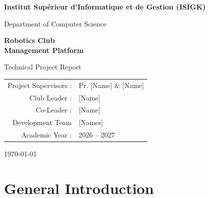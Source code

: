 \documentclass[12pt,a4paper]{report}
\begin{document}
\begin{titlepage}
    \centering
    \vspace*{1cm}

    {\Large \textbf{Institut Supérieur d'Informatique et de Gestion (ISIGK)}\par}
    \vspace{0.5cm}
    {\large Department of Computer Science\par}

    \vspace{2cm}
    {\Huge \textbf{Robotics Club\\[0.2cm] Management Platform}\par}
    \vspace{1cm}
    {\Large Technical Project Report\par}

    \vspace{2cm}
    {\large
    \begin{tabular}{rl}
        Project Supervisors : & Pr. [Name] \& [Name] \\
        Club Leader         : & [Name] \\
        Co-Leader           : & [Name] \\
        Development Team    & [Names] \\
        Academic Year       : & 2026 -- 2027 \\
    \end{tabular}\par}

    \vfill
    {\large \today\par}
\end{titlepage}

\tableofcontents
\listoftables
\listoffigures

\clearpage

\chapter{General Introduction}
\end{document}
